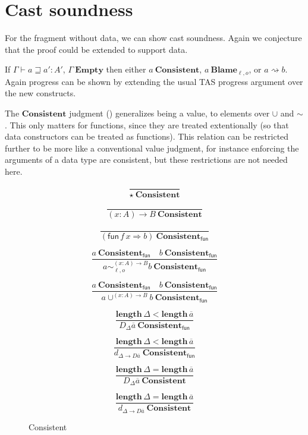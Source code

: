 \section{Cast soundness}

For the fragment without data, we can show cast soundness.
Again we conjecture that the proof could be extended to support data.
 
If $\varGamma\vdash a\sqsupseteq a':A'$, $\varGamma\ \mathbf{Empty}$ then either $a\ \mathbf{Consistent}$, $a\ \mathbf{Blame}_{\ell,o}$, or $a\rightsquigarrow b$.
Again progress can be shown by extending the usual \ac{TAS} progress argument over the new constructs.

The $\mathbf{Consistent}$ judgment () generalizes being a value, to elements over $\cup$ and $\sim$.
This only matters for functions, since they are treated extentionally (so that data constructors can be treated as functions).
This relation can be restricted further to be more like a conventional value judgment, for instance enforcing the arguments of a data type are consistent, but these restrictions are not needed here.

\begin{figure}
\[
\frac{\ }{\star\ \mathbf{Consistent}}
\]

\[
\frac{\ }{\left(x:A\right)\rightarrow B\ \mathbf{Consistent}}
\]

\[
\frac{\ }{\left(\mathsf{fun}\,f\,x\Rightarrow b\right)\ \mathbf{Consistent_{\mathsf{fun}}}}
\]

\[
\frac{
  a\ \mathbf{Consistent_{\mathsf{fun}}}\quad b\ \mathbf{Consistent_{\mathsf{fun}}}
}{
  a\sim_{\ell,o}^{\left(x:A\right)\rightarrow B}b\ \mathbf{Consistent_{\mathsf{fun}}}}
\]

\[
\frac{
  a\ \mathbf{Consistent_{\mathsf{fun}}}\quad b\ \mathbf{Consistent_{\mathsf{fun}}}
}{
  a\cup^{\left(x:A\right)\rightarrow B}b\ \mathbf{Consistent_{\mathsf{fun}}}
}
\]

\[
\frac{
  \mathbf{length}\,\Delta < \mathbf{length}\,\overline{a}
}{
  D_{\Delta}\overline{a}\ \mathbf{Consistent_{\mathsf{fun}}}
}
\]

\[
\frac{
  \mathbf{length}\,\Delta < \mathbf{length}\,\overline{a}
}{
  d_{\Delta\rightarrow D\overline{a}}\ \mathbf{Consistent_{\mathsf{fun}}}
}
\]

\[
\frac{
  \mathbf{length}\,\Delta = \mathbf{length}\,\overline{a}
}{
  D_{\Delta}\overline{a}\ \mathbf{Consistent}
}
\]

\[
\frac{
  \mathbf{length}\,\Delta = \mathbf{length}\,\overline{a}
}{
  d_{\Delta\rightarrow D\overline{a}}\ \mathbf{Consistent}
}
\]

\caption{Consistent}
\label{fig:cast-data-val}
\end{figure}


